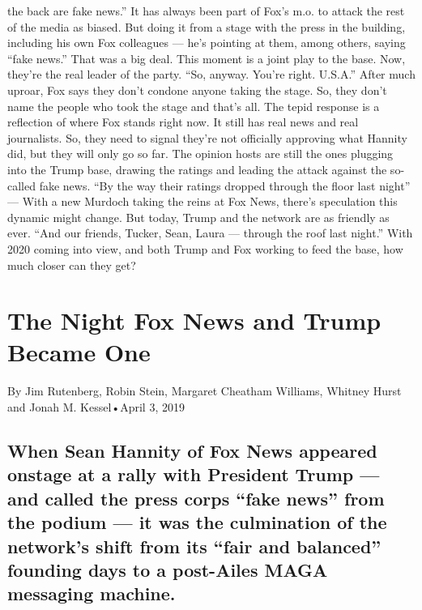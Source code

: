 \begin{itemize}
  the back are fake news.'' It has always been part of Fox's m.o. to
  attack the rest of the media as biased. But doing it from a stage with
  the press in the building, including his own Fox colleagues --- he's
  pointing at them, among others, saying ``fake news.'' That was a big
  deal. This moment is a joint play to the base. Now, they're the real
  leader of the party. ``So, anyway. You're right. U.S.A.'' After much
  uproar, Fox says they don't condone anyone taking the stage. So, they
  don't name the people who took the stage and that's all. The tepid
  response is a reflection of where Fox stands right now. It still has
  real news and real journalists. So, they need to signal they're not
  officially approving what Hannity did, but they will only go so far.
  The opinion hosts are still the ones plugging into the Trump base,
  drawing the ratings and leading the attack against the so-called fake
  news. ``By the way their ratings dropped through the floor last
  night'' --- With a new Murdoch taking the reins at Fox News, there's
  speculation this dynamic might change. But today, Trump and the
  network are as friendly as ever. ``And our friends, Tucker, Sean,
  Laura --- through the roof last night.'' With 2020 coming into view,
  and both Trump and Fox working to feed the base, how much closer can
  they get?
\end{itemize}

\hypertarget{the-night-fox-news-and-trump-became-one-1}{%
\section{The Night Fox News and Trump Became
One}\label{the-night-fox-news-and-trump-became-one-1}}

By Jim Rutenberg, Robin Stein, Margaret Cheatham Williams, Whitney Hurst
and Jonah M. Kessel•April 3, 2019

\hypertarget{when-sean-hannity-of-fox-news-appeared-onstage-at-a-rally-with-president-trump--and-called-the-press-corps-fake-news-from-the-podium--it-was-the-culmination-of-the-networks-shift-from-its-fair-and-balanced-founding-days-to-a-post-ailes-maga-messaging-machine-1}{%
\subsection{When Sean Hannity of Fox News appeared onstage at a rally
with President Trump --- and called the press corps ``fake news'' from
the podium --- it was the culmination of the network's shift from its
``fair and balanced'' founding days to a post-Ailes MAGA messaging
machine.}\label{when-sean-hannity-of-fox-news-appeared-onstage-at-a-rally-with-president-trump--and-called-the-press-corps-fake-news-from-the-podium--it-was-the-culmination-of-the-networks-shift-from-its-fair-and-balanced-founding-days-to-a-post-ailes-maga-messaging-machine-1}}

